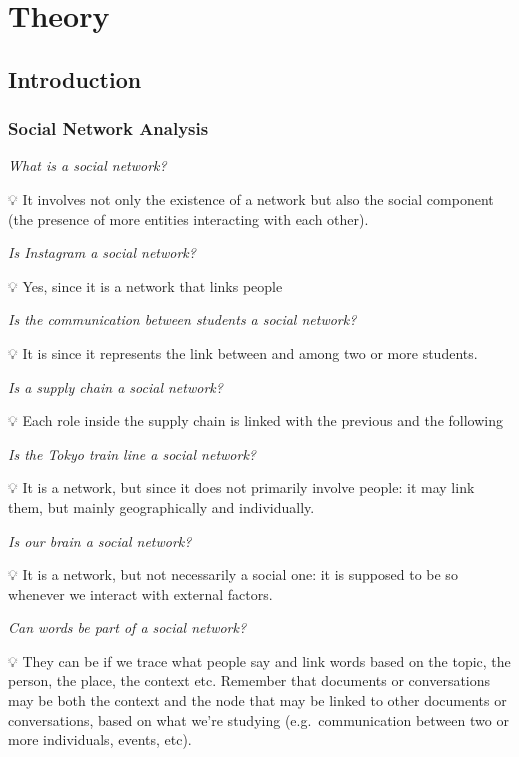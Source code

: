 \documentclass[
  notitlepage,
  onecolumn,
  openany]{book}
\author{}
\date{\vspace{-2.5em}}
\begin{document}
\pagestyle{empty}


{
\hypersetup{linkcolor=}
\setcounter{tocdepth}{1}
\tableofcontents
}
\part{Theory}

\hypertarget{introduction}{%
\chapter{Introduction}\label{introduction}}

\hypertarget{social-network-analysis}{%
\section{Social Network Analysis}\label{social-network-analysis}}

\emph{What is a social network?}

💡 It involves not only the existence of a network but also the social component (the presence of more entities interacting with each other).

\emph{Is Instagram a social network?}

💡 Yes, since it is a network that links people

\emph{Is the communication between students a social network?}

💡 It is since it represents the link between and among two or more students.

\emph{Is a supply chain a social network?}

💡 Each role inside the supply chain is linked with the previous and the following

\emph{Is the Tokyo train line a social network?}

💡 It is a network, but since it does not primarily involve people: it may link them, but mainly geographically and individually.

\emph{Is our brain a social network?}

💡 It is a network, but not necessarily a social one: it is supposed to be so whenever we interact with external factors.

\emph{Can words be part of a social network?}

💡 They can be if we trace what people say and link words based on the topic, the person, the place, the context etc. Remember that documents or conversations may be both the context and the node that may be linked to other documents or conversations, based on what we're studying (e.g.~communication between two or more individuals, events, etc).
\end{document}

